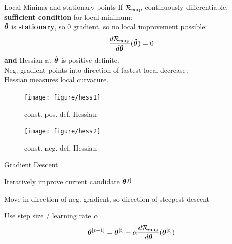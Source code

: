 \documentclass[11pt,compress,t,notes=noshow, xcolor=table]{beamer}
\begin{document}
\begin{frame2}[footnotesize]{Local Minima and stationary points}
If $\mathcal{R}_{\text{emp}}$ continuously differentiable, \textbf{sufficient condition} for local minimum: \\
$\bm{\hat\theta}$ is \textbf{stationary}, so 0 gradient, so no local improvement possible:
$$
\frac{d \mathcal{R}_{\text{emp}}}{d\bm{\theta}}(\bm{\hat\theta}) = 0
$$
\textbf{and} Hessian at $\bm{\hat\theta}$ is positive definite. \\
Neg. gradient points into direction of fastest local decrease;\\
Hessian measures local curvature.
\vfill
\begin{figure}[!htb]
{
\texttt{[image: figure/hess1]}
\caption*{\footnotesize const. pos. def. Hessian}
}
{
\texttt{[image: figure/hess2]}
\caption*{\footnotesize const. neg. def. Hessian}
}
\end{figure}
\end{frame2}


\begin{framei}{Gradient Descent}
\item Iteratively improve  current candidate $\bm{\theta}^{[t]}$ 
\item Move in direction of  neg. gradient, so direction of steepest descent
\item Use step size / learning rate $\alpha$ 
$$
\bm{\theta}^{[t+1]} = \bm{\theta}^{[t]} - \alpha \frac{d \mathcal{R}_{\text{emp}}}{d\bm{\theta}}{(\bm{\theta}^{[t]})}
$$
\end{framei}
\end{document}
